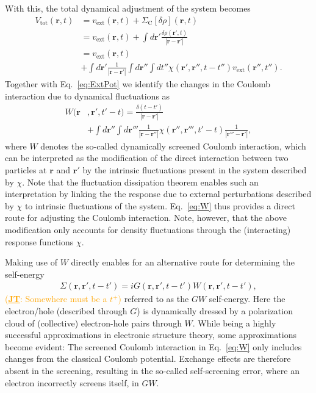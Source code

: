 \documentclass[aip,jcp,reprint,noshowkeys,superscriptaddress]{revtex4-2}
\newcommand{\jt}[1]{\textcolor{orange}{#1}}
\newcommand{\JT}[1]{\jt{(\underline{\bf JT}: #1)}}
\newcommand{\br}{\boldsymbol{r}}
\begin{document}
With this, the total dynamical adjustment of the system becomes 
\begin{align}
    V_\mathrm{tot}(\mathbf{r},t) &= v_\mathrm{ext}(\mathbf{r},t) + \Sigma_\mathrm{C}[\delta \rho](\mathbf{r},t) \\
    &=v_\mathrm{ext}(\mathbf{r},t) + \int d\mathbf{r}' \frac{\delta \rho(\mathbf{r}', t)}{|\mathbf{r} - \mathbf{r}'|} \nonumber \\
    &=v_\mathrm{ext}(\mathbf{r},t) \nonumber \\
    &+
    \int d\mathbf{r}' \frac{1}{|\mathbf{r} - \mathbf{r}'|} \int d\mathbf{r}'' \int dt'' \chi(\mathbf{r}',\mathbf{r}'', t-t'') v_\mathrm{ext}(\mathbf{r}'', t'').
\end{align}
Together with Eq.~\eqref{eq:ExtPot} we identify the changes in the Coulomb interaction due to dynamical fluctuations as
\begin{align}
    W(\mathbf{r}&,\mathbf{r}', t'-t) = \frac{\delta(t-t')}{|\mathbf{r} - \mathbf{r}'|} \nonumber \\
    &+ \int d\mathbf{r}'' \int d \mathbf{r}''' \frac{1}{|\mathbf{r} - \mathbf{r}''|} \chi(\mathbf{r}'',\mathbf{r}''', t'-t)\frac{1}{|\mathbf{r}''' - \mathbf{r}'|},
    \label{eq:W}
\end{align}
where $W$ denotes the so-called dynamically screened Coulomb interaction, which can be interpreted as the modification of the direct interaction between two particles at $\br$ and $\br'$ by the intrinsic fluctuations present in the system described by $\chi$.
Note that the fluctuation dissipation theorem enables such an interpretation by linking the the response due to external perturbations described by $\chi$ to intrinsic fluctuations of the system.
Eq.~\eqref{eq:W} thus provides a direct route for adjusting the Coulomb interaction.
Note, however, that the above modification only accounts for density fluctuations through the (interacting) response functions $\chi$.


Making use of $W$ directly enables for an alternative route for determining the self-energy
\begin{align}
    \Sigma(\mathbf{r},\mathbf{r}', t-t') = i G(\mathbf{r},\mathbf{r}', t-t') W(\mathbf{r},\mathbf{r}', t-t'),
\end{align}
\JT{Somewhere must be a $t^+$}
referred to as the $GW$ self-energy.
Here the electron/hole (described through $G$) is dynamically dressed by a polarization cloud of (collective) electron-hole pairs through $W$.
While being a highly successful approximations in electronic structure theory, some approximations become evident:
The screened Coulomb interaction in Eq.~\eqref{eq:W} only includes changes from the classical Coulomb potential. 
Exchange effects are therefore absent in the screening, resulting in the so-called self-screening error, where an electron incorrectly screens itself, in $GW$.
\end{document}
